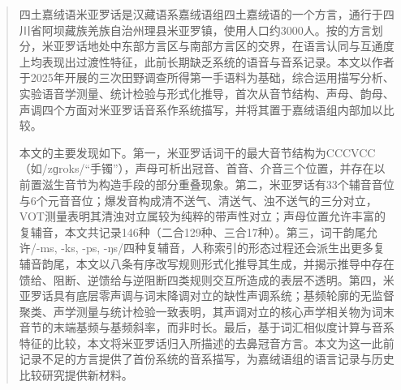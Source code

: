 \documentclass[
    decl-page,  %
    twoside,                %
    cjk-font = win,
    latin-font = none,
  ]{njuthesis}
\begin{document}

\maketitle

\raggedbottom

\begin{abstract}
  四土嘉绒语米亚罗话是汉藏语系嘉绒语组四土嘉绒语的一个方言，通行于四川省阿坝藏族羌族自治州理县米亚罗镇，使用人口约3000人。按\textcite{gates2014situ}的方言划分，米亚罗话地处中东部方言区与南部方言区的交界，在语言认同与互通度上均表现出过渡性特征，此前长期缺乏系统的语音与音系记录。本文以作者于2025年开展的三次田野调查所得第一手语料为基础，综合运用描写分析、实验语音学测量、统计检验与形式化推导，首次从音节结构、声母、韵母、声调四个方面对米亚罗话音系作系统描写，并将其置于嘉绒语组内部加以比较。
  
  本文的主要发现如下。第一，米亚罗话词干的最大音节结构为CCCVCC（如/zɡroks/“手镯”），声母可析出冠音、首音、介音三个位置，并存在以前置滋生音节为构造手段的部分重叠现象。第二，米亚罗话有33个辅音音位与6个元音音位；爆发音构成清不送气、清送气、浊不送气的三分对立，VOT测量表明其清浊对立属较为纯粹的带声性对立；声母位置允许丰富的复辅音，本文共记录146种（二合129种、三合17种）。第三，词干韵尾允许/-ms, -ks, -ps, -ŋs/四种复辅音，人称索引的形态过程还会派生出更多复辅音韵尾，本文以八条有序改写规则形式化推导其生成，并揭示推导中存在馈给、阻断、逆馈给与逆阻断四类规则交互所造成的表层不透明。第四，米亚罗话具有底层零声调与词末降调对立的缺性声调系统；基频轮廓的无监督聚类、声学测量与统计检验一致表明，其声调对立的核心声学相关物为词末音节的末端基频与基频斜率，而非时长。最后，基于词汇相似度计算与音系特征的比较，本文将米亚罗话归入\textcite{Gong2018-aw}所描述的去鼻冠音方言。本文为这一此前记录不足的方言提供了首份系统的音系描写，为嘉绒语组的语言记录与历史比较研究提供新材料。
\end{abstract}
\end{document}
